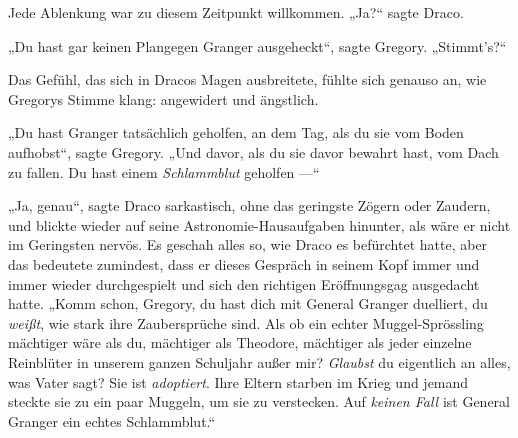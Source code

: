 Jede Ablenkung war zu diesem Zeitpunkt willkommen.
„Ja?“ sagte Draco.

„Du hast gar keinen Plangegen Granger ausgeheckt“, sagte Gregory.
„Stimmt’s?“

Das Gefühl, das sich in Dracos Magen ausbreitete, fühlte sich genauso an, wie Gregorys Stimme klang: angewidert und ängstlich.

„Du hast Granger tatsächlich geholfen, an dem Tag, als du sie vom Boden aufhobst“, sagte Gregory.
„Und davor, als du sie davor bewahrt hast, vom Dach zu fallen. Du hast einem \emph{Schlammblut} geholfen —“

„Ja, genau“, sagte Draco sarkastisch, ohne das geringste Zögern oder Zaudern, und blickte wieder auf seine Astronomie-Hausaufgaben hinunter, als wäre er nicht im Geringsten nervös. Es geschah alles so, wie Draco es befürchtet hatte, aber das bedeutete zumindest, dass er dieses Gespräch in seinem Kopf immer und immer wieder durchgespielt und sich den richtigen Eröffnungsgag ausgedacht hatte.
„Komm schon, Gregory, du hast dich mit General Granger duelliert, du \emph{weißt}, wie stark ihre Zaubersprüche sind. Als ob ein echter Muggel-Sprössling mächtiger wäre als du, mächtiger als Theodore, mächtiger als jeder einzelne Reinblüter in unserem ganzen Schuljahr außer mir? \emph{Glaubst} du eigentlich an alles, was Vater sagt? Sie ist \emph{adoptiert}. Ihre Eltern starben im Krieg und jemand steckte sie zu ein paar Muggeln, um sie zu verstecken. Auf \emph{keinen Fall} ist General Granger ein echtes Schlammblut.“


